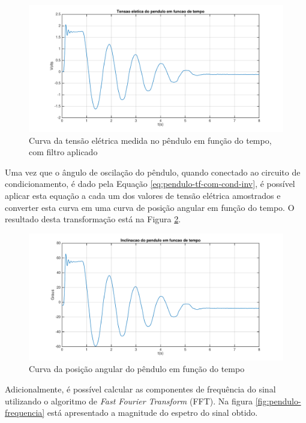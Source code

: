 \documentclass[a4paper]{instrumentacao}
\begin{document}
\begin{figure}[H]
\centering
\includegraphics[width=\textwidth]{time-plot.pdf}
\caption{Curva da tensão elétrica medida no pêndulo em função do tempo, com filtro aplicado}
\label{fig:pendulo-curva-tensao-vs-tempo-filtrado}
\end{figure}

Uma vez que o ângulo de oscilação do pêndulo, quando conectado ao circuito de condicionamento, é dado pela Equação \ref{eq:pendulo-tf-com-cond-inv}, é possível aplicar esta equação a cada um dos valores de tensão elétrica amostrados e converter esta curva em uma curva de posição angular em função do tempo. O resultado desta transformação está na Figura \ref{fig:pendulo-curva-angulo-vs-tempo}. 

\begin{figure}[H]
\centering
\includegraphics[width=\textwidth]{angle-time-plot.pdf}
\caption{Curva da posição angular do pêndulo em função do tempo}
\label{fig:pendulo-curva-angulo-vs-tempo}
\end{figure}

Adicionalmente, é possível calcular as componentes de frequência do sinal utilizando o algoritmo de \textit{Fast Fourier Transform} (FFT). Na figura \ref{fig:pendulo-frequencia} está apresentado a magnitude do espetro do sinal obtido.
\end{document}
